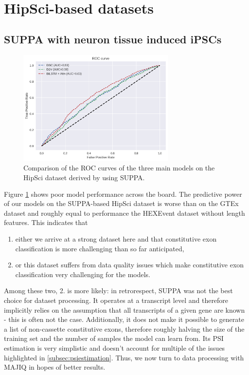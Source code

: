 \section{HipSci-based datasets} \label{sec:hipsci} 

\subsection{SUPPA with neuron tissue induced iPSCs} \label{subsec:hipsci_suppa}

\begin{figure}
	\centering\includegraphics[width=0.7\textwidth]{../visualizations/ch5-results/suppa_cross_model_roc_auc_comparison.png} 
	\caption{Comparison of the ROC curves of the three main models on the HipSci dataset derived by using SUPPA. }
	\label{fig:suppa_auc_roc}
\end{figure}

Figure \ref{fig:suppa_auc_roc} shows poor model performance across the board. The predictive power of our models on the SUPPA-based HipSci dataset is worse than on the GTEx dataset and roughly equal to performance the HEXEvent dataset without length features. This indicates that 
\begin{enumerate}
	\item either we arrive at a strong dataset here and that constitutive exon classification is more challenging than so far anticipated,
	\item or this dataset suffers from data quality issues which make constitutive exon classification very challenging for the models.
\end{enumerate}
Among these two, 2. is more likely: in retrorespect, SUPPA was not the best choice for dataset processing. It operates at a transcript level and therefore implicitly relies on the assumption that all transcripts of a given gene are known - this is often not the case. Additionally, it does not make it possible to generate a list of non-cassette constitutive exons, therefore roughly halving the size of the training set and the number of samples the model can learn from. Its PSI estimation is very simplistic and doesn't account for multiple of the issues highlighted in \ref{subsec:psiestimation}. Thus, we now turn to data processing with MAJIQ in hopes of better results. 

